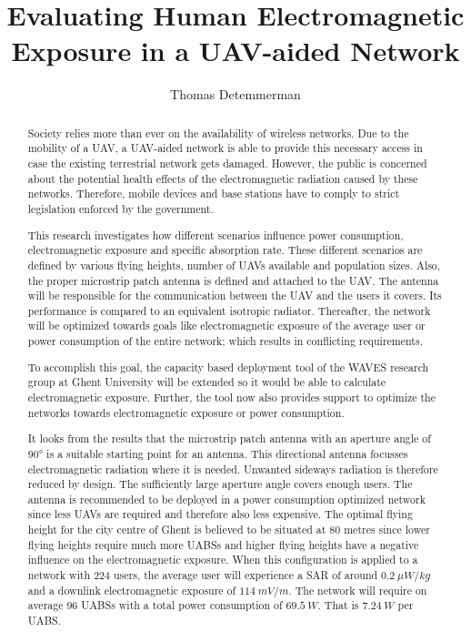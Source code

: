 \documentclass[twocolumn]{phdsymp} %
\begin{document}
\title{Evaluating Human Electromagnetic Exposure in a UAV-aided Network}

\author{Thomas Detemmerman}


\maketitle

\begin{abstract}
Society relies more than ever on the availability of wireless networks.
Due to the mobility of a UAV, a UAV-aided network is able to provide this necessary access in case the existing terrestrial network gets damaged.
However,  the public is 
concerned about the potential health effects of the electromagnetic radiation caused by these networks.
Therefore, mobile devices and base stations have to comply to strict legislation enforced by the government.

This research investigates how different scenarios influence power consumption, electromagnetic exposure and specific absorption rate.
These different scenarios are defined by various flying heights, number of UAVs available and population sizes. Also, 
the proper microstrip patch antenna is defined and attached to the UAV. 
The antenna will be responsible for the communication between the UAV and the users it covers.
Its performance is compared to  
an equivalent isotropic radiator.
Thereafter, the network will be optimized towards goals like electromagnetic exposure of the average user or 
power consumption of the entire network; which results in conflicting requirements.

To accomplish this goal, the capacity based deployment tool of the WAVES research group at Ghent University
will be extended so it would be able to calculate electromagnetic exposure.
Further, the tool now also provides support to optimize the networks towards electromagnetic exposure or power consumption.

It looks from the results that 
the microstrip patch antenna with an aperture angle of \ang{90} is a suitable starting point for an antenna. 
This directional antenna focusses electromagnetic radiation where it is needed. Unwanted sideways radiation 
is therefore reduced by design.
The sufficiently large aperture angle covers enough users. The antenna is recommended to be deployed in a power consumption 
optimized network since less UAVs are required and therefore also less expensive.
The optimal flying height for the city centre of Ghent is believed to be situated at 80 metres since lower flying heights require much more UABSs and
higher flying heights have a negative influence on the electromagnetic exposure. 
When this configuration is applied to a network with 224 users, the average user will 
experience a SAR of around $0.2\ \mu W/kg$ and
 a downlink electromagnetic exposure of $114\ mV/m$. The network will require on average 96 UABSs with a total
power consumption of $69.5\ W$. That is $7.24\ W$ per UABS.
\end{abstract}
\end{document}
